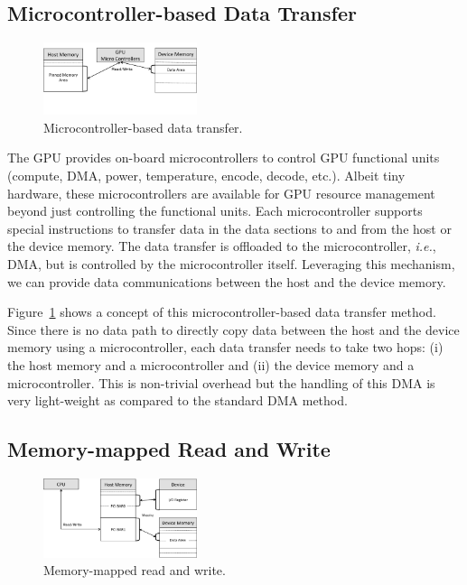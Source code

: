 \subsection{Microcontroller-based Data Transfer}
\label{sec:micro}

\begin{figure}[!t]
 \centering
 \includegraphics[width=0.4\textwidth]{figure/Method/Micro_Method.pdf}
 \caption{Microcontroller-based data transfer.}
 \label{fig:micro}
\end{figure}

The GPU provides on-board microcontrollers to control GPU functional
units (compute, DMA, power, temperature, encode, decode, etc.).
Albeit tiny hardware, these microcontrollers are available for GPU
resource management beyond just controlling the functional units.
Each microcontroller supports special instructions to transfer data in
the data sections to and from the host or the device memory.
The data transfer is offloaded to the microcontroller, \textit{i.e.},
DMA, but is controlled by the microcontroller itself.
Leveraging this mechanism, we can provide data communications between
the host and the device memory.

Figure~\ref{fig:micro} shows a concept of this microcontroller-based
data transfer method.
Since there is no data path to directly copy data between the host and
the device memory using a microcontroller, each data transfer needs
to take two hops: (i) the host memory and a microcontroller and (ii) the
device memory and a microcontroller.
This is non-trivial overhead but the handling of this DMA is very
light-weight as compared to the standard DMA method.

\subsection{Memory-mapped Read and Write}
\label{sec:iorw}

\begin{figure}[!t]
 \centering
 \includegraphics[width=0.4\textwidth]{figure/Method/IORW_Method.pdf}
 \caption{Memory-mapped read and write.}
 \label{fig:iorw}
\end{figure}

